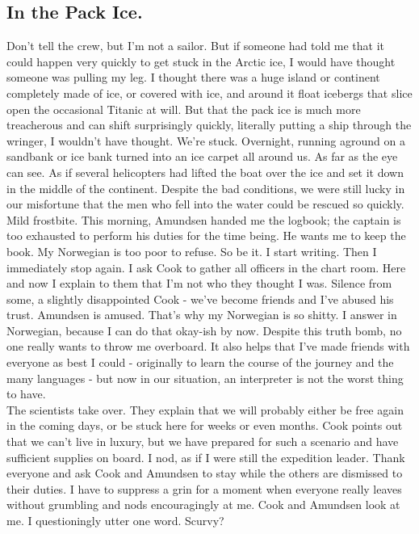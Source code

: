 \documentclass{article}
\begin{document}
  \subsection{In the Pack Ice.}
  \noindent Don't tell the crew, but I'm not a sailor. But if someone had told me that it could happen very quickly to get
  stuck in the Arctic ice, I would have thought someone was pulling my leg. I thought there was a huge island or
  continent completely made of ice, or covered with ice, and around it float icebergs that slice open the
  occasional
  Titanic at will. But that the pack ice is much more treacherous and can shift surprisingly quickly, literally
  putting a ship through the wringer, I wouldn't have thought. We're stuck. Overnight, running aground on a
  sandbank
  or ice bank turned into an ice carpet all around us. As far as the eye can see. As if several helicopters had
  lifted the boat over the ice and set it down in the middle of the continent. Despite the bad conditions, we were
  still lucky in our misfortune that the men who fell into the water could be rescued so quickly. Mild frostbite.
  This morning, Amundsen handed me the logbook; the captain is too exhausted to perform his duties for the time
  being. He wants me to keep the book. My Norwegian is too poor to refuse. So be it. I start writing. Then I
  immediately stop again. I ask Cook to gather all officers in the chart room. Here and now I explain to them that
  I'm not who they thought I was. Silence from some, a slightly disappointed Cook - we've become friends and I've
  abused his trust. Amundsen is amused. That's why my Norwegian is so shitty. I answer in Norwegian, because I can
  do that okay-ish by now. Despite this truth bomb, no one really wants to throw me overboard. It also helps that
  I've made friends with everyone as best I could - originally to learn the course of the journey and the many
  languages - but now in our situation, an interpreter is not the worst thing to have.\\
  \noindent The scientists take over. They explain that we will probably either be free again in the coming days, or be
  stuck
  here for weeks or even months. Cook points out that we can't live in luxury, but we have prepared for such a
  scenario and have sufficient supplies on board. I nod, as if I were still the expedition leader. Thank everyone
  and ask Cook and Amundsen to stay while the others are dismissed to their duties. I have to suppress a grin for
  a
  moment when everyone really leaves without grumbling and nods encouragingly at me. Cook and Amundsen look at me.
  I
  questioningly utter one word. Scurvy?\\
\end{document}
